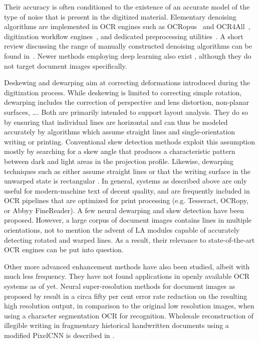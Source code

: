 Their accuracy is often conditioned to the existence of an accurate model of
the type of noise that is present in the digitized material. Elementary
denoising algorithms are implemented in OCR engines such as
OCRopus~\cite{breuel2008ocropus} and OCR4All~\cite{reul2019ocr4all},
digitization workflow engines~\cite{neudecker2019ocr}, and dedicated
preprocessing utilities~\cite{scantailor}. A short review discussing the range
of manually constructed denoising algorithms can be found
in~\cite{fan2019brief}. Newer methods employing deep learning also exist
\cite{cha2019fully,laine2019high,soltanayev2018training,chen2018image},
although they do not target document images specifically.

Deskewing and dewarping aim at correcting deformations introduced during the
digitization process. While deskewing is limited to correcting simple rotation,
dewarping includes the correction of perspective and lens distortion,
non-planar surfaces, \dots. Both are primarily intended to support layout
analysis. They do so by ensuring that individual lines are horizontal and can
thus be modeled accurately by algorithms which assume straight lines and
single-orientation writing or printing. Conventional skew detection methods
\cite{bloomberg1995measuring,amin2000document,papandreou2011novel} exploit this
assumption mostly by searching for a skew angle that produces a characteristic
pattern between dark and light areas in the projection profile. Likewise,
dewarping techniques such as
\cite{zhang2003correcting,ulges2005document,masalovitch2007usage} either assume
straight lines or that the writing surface in the unwarped state is rectangular
\cite{stamatopoulos2008two}. In general, systems as described above are only
useful for modern-machine text of decent quality, and are frequently included
in OCR pipelines that are optimized for print processing (e.g. Tesseract,
OCRopy, or Abbyy FineReader). A few neural dewarping
\cite{das2019dewarpnet,ma2018docunet} and skew detection \cite{ocropus3} have
been proposed. However, a large corpus of document images contains lines in
multiple orientations, not to mention the advent of LA modules capable of
accurately detecting rotated and warped lines. As a result, their relevance to
state-of-the-art OCR engines can be put into question. 

Other more advanced enhancement methods have also been studied, albeit with
much less frequency. They have not found applications in openly available OCR
systems as of yet. Neural super-resolution methods for document images as
proposed by \cite{dong2015boosting,lat2018enhancing,fu2019cascaded} result in a
circa fifty per cent error rate reduction on the resulting high resolution
output, in comparison to the original low resolution images, when using a
character segmentation OCR for recognition. Wholesale reconstruction of
illegible writing in fragmentary historical handwritten documents using a
modified PixelCNN is described in \cite{uzan2017qumran}. 

